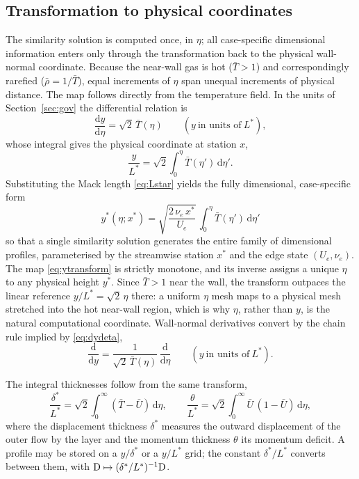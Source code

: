 \documentclass[11pt]{article}
\begin{document}
\subsection{Transformation to physical coordinates}\label{sec:transform}
The similarity solution is computed once, in $\eta$; all case-specific dimensional information enters
only through the transformation back to the physical wall-normal coordinate. Because the near-wall gas is
hot ($\bar T>1$) and correspondingly rarefied ($\bar\rho=1/\bar T$), equal increments of $\eta$ span
unequal increments of physical distance. The map follows directly from the temperature field. In the
units of Section~\ref{sec:gov} the differential relation is
\begin{equation}\label{eq:dydeta}
  \frac{\mathrm dy}{\mathrm d\eta}=\sqrt2\,\bar T(\eta)\qquad(y\ \text{in units of}\ L^*),
\end{equation}
whose integral gives the physical coordinate at station $x$,
\begin{equation}\label{eq:ytransform}
  \frac{y}{L^*}=\sqrt2\int_0^\eta \bar T(\eta')\,\mathrm d\eta' .
\end{equation}
Substituting the Mack length \eqref{eq:Lstar} yields the fully dimensional, case-specific form
\begin{equation}\label{eq:ydim}
  \boxed{\;y^*(\eta;x^*)=\sqrt{\frac{2\,\nu_e\,x^*}{U_e}}\,\int_0^\eta \bar T(\eta')\,\mathrm d\eta'\;}
\end{equation}
so that a single similarity solution generates the entire family of dimensional profiles, parameterised
by the streamwise station $x^*$ and the edge state $(U_e,\nu_e)$. The map \eqref{eq:ytransform} is
strictly monotone, and its inverse assigns a unique $\eta$ to any physical height $y^*$. Since
$\bar T>1$ near the wall, the transform outpaces the linear reference $y/L^*=\sqrt2\,\eta$ there: a
uniform $\eta$ mesh maps to a physical mesh stretched into the hot near-wall region, which is why $\eta$,
rather than $y$, is the natural computational coordinate. Wall-normal derivatives convert by the chain
rule implied by \eqref{eq:dydeta},
\begin{equation}\label{eq:chain}
  \frac{\mathrm d}{\mathrm dy}=\frac{1}{\sqrt2\,\bar T(\eta)}\,\frac{\mathrm d}{\mathrm d\eta}
  \qquad(y\ \text{in units of}\ L^*).
\end{equation}

The integral thicknesses follow from the same transform,
\begin{equation}\label{eq:thicknesses}
  \frac{\delta^*}{L^*}=\sqrt2\int_0^\infty(\bar T-\bar U)\,\mathrm d\eta,\qquad
  \frac{\theta}{L^*}=\sqrt2\int_0^\infty\bar U\,(1-\bar U)\,\mathrm d\eta,
\end{equation}
where the displacement thickness $\delta^*$ measures the outward displacement of the outer flow by the
layer and the momentum thickness $\theta$ its momentum deficit. A profile may be stored on a $y/\delta^*$
or a $y/L^*$ grid; the constant $\delta^*/L^*$ converts between them, with
$\mathrm{D}\mapsto(\delta^*/L^*)^{-1}\mathrm{D}$.
\end{document}
